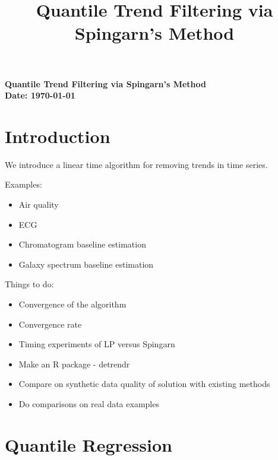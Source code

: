 \documentclass{article}
\begin{document}
\title{Quantile Trend Filtering via Spingarn's Method}
\noindent
\textbf{Quantile Trend Filtering via Spingarn's Method}\\
\textbf{Date: \today}\\

\section{Introduction}

We introduce a linear time algorithm for removing trends in time series.

Examples:
\begin{itemize}
\item Air quality 
\item ECG \cite{Sanyal2012}
\item Chromatogram baseline estimation  \cite{Ning2014, Ilewicz2015}
\item Galaxy spectrum baseline estimation \cite{Ilewicz2015,Bacher2016}
\end{itemize}

Things to do:
\begin{itemize}
	\item Convergence of the algorithm
	\item Convergence rate \cite{He2012, He2015, Davis2017}
	\item Timing experiments of LP versus Spingarn
	\item Make an R package - detrendr
	\item Compare on synthetic data quality of solution with existing methods
	\item Do comparisons on real data examples
\end{itemize}

\section{Quantile Regression}
\end{document}

